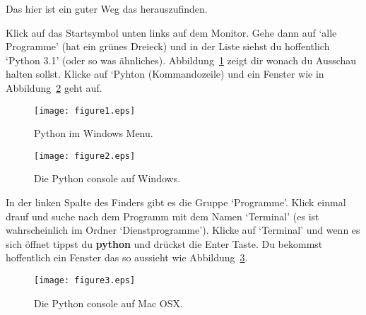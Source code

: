 \noindent
Das hier ist ein guter Weg das herauszufinden.

\begin{WINDOWS}
Klick auf das Startsymbol unten links auf dem Monitor. Gehe dann auf `alle Programme' (hat ein grünes Dreieck) und in der Liste siehst du hoffentlich `Python 3.1' (oder so was ähnliches). Abbildung~\ref{fig1} zeigt dir wonach du Ausschau halten sollst. Klicke auf `Pyhton (Kommandozeile) und ein Fenster wie in Abbildung~\ref{fig2} geht auf.

\begin{figure}
\begin{center}
\texttt{[image: figure1.eps]}
\end{center}
\caption{Python im Windows Menu.}\label{fig1}
\end{figure}

\begin{figure}
\begin{center}
\texttt{[image: figure2.eps]}
\end{center}
\caption{Die Python console auf Windows.}\label{fig2}
\end{figure}
\end{WINDOWS}

\begin{MAC}
In der linken Spalte des Finders gibt es die Gruppe `Programme'. Klick einmal drauf und suche nach dem Programm mit dem Namen `Terminal' (es ist wahrscheinlich im Ordner `Dienstprogramme').
Klicke auf `Terminal' und wenn es sich öffnet tippst du \textbf{python} und drückst die Enter Taste. Du bekommst hoffentlich ein Fenster das so aussieht wie Abbildung~\ref{fig3}.


\begin{figure}
\begin{center}
\texttt{[image: figure3.eps]}
\end{center}
\caption{Die Python console auf Mac OSX.}\label{fig3}
\end{figure}
\end{MAC}

